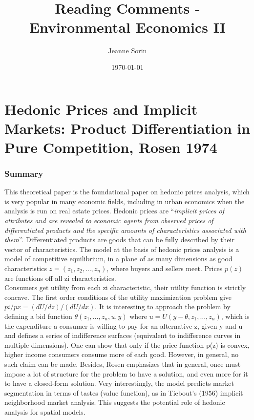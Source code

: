 \documentclass[12pt, final]{article}
\title{Reading Comments - Environmental Economics II}
\author{Jeanne Sorin}
\date{\today}
\begin{document}
\maketitle

\section*{Hedonic Prices and Implicit Markets: Product Differentiation in Pure Competition, Rosen 1974} %
\label{sec:hedonic_prices_and_implicit_markets_product_differentiation_in_pure_competition_rosen_}

\subsubsection*{Summary} %
\label{ssub:summary}

This theoretical paper is the foundational paper on hedonic prices analysis, which is very popular in many economic fields, including in urban economics when the analysis is run on real estate prices.
%
Hedonic prices are ``\textit{implicit prices of attributes and are revealed to economic agents from observed prices of differentiated products and the specific amounts of characteristics associated with them}’’. Differentiated products are goods that can be fully described by their vector of characteristics.
%
The model at the basis of hedonic prices analysis is a model of competitive equilibrium, in a plane of as many dimensions as good characteristics $z = (z_1, z_2, …, z_n)$, where buyers and sellers meet. Prices $p(z)$ are functions off all zi characteristics.
\\

Consumers get utility from each zi characteristic, their utility function is strictly concave. The first order conditions of the utility maximization problem give $pi/px = (dU/dz)/(dU/dx)$. It is interesting to approach the problem by defining a bid function $\theta(z_1, …, z_n, u, y)$ where $u = U(y - \theta, z_1, …, z_n)$, which is the expenditure a consumer is willing to pay for an alternative z, given y and u and defines a series of indifference surfaces (equivalent to indifference curves in multiple dimensions). 
One can show that only if the price function p(z) is convex, higher income consumers consume more of each good. However, in general, no such claim can be made. Besides, Rosen emphasizes that in general, once must impose a lot of structure for the problem to have a solution, and even more for it to have a closed-form solution.
Very interestingly, the model predicts market segmentation in terms of tastes (value function), as in Tiebout’s (1956) implicit neighborhood market analysis. This suggests the potential role of hedonic analysis for spatial models. 
\end{document}
